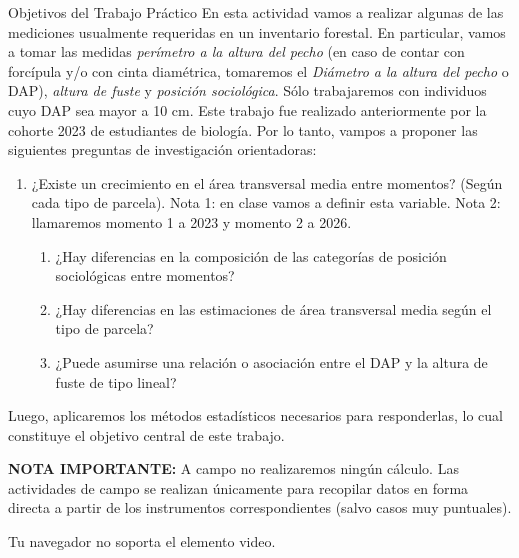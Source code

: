 \documentclass[
  spanish,
  letterpaper,
  DIV=11,
  numbers=noendperiod]{scrreprt}
\begin{document}
Objetivos del Trabajo Práctico En esta actividad vamos a realizar
algunas de las mediciones usualmente requeridas en un inventario
forestal. En particular, vamos a tomar las medidas \emph{perímetro a la
altura del pecho} (en caso de contar con forcípula y/o con cinta
diamétrica, tomaremos el \emph{Diámetro a la altura del pecho} o DAP),
\emph{altura de fuste} y \emph{posición sociológica}. Sólo trabajaremos
con individuos cuyo DAP sea mayor a 10 cm. Este trabajo fue realizado
anteriormente por la cohorte 2023 de estudiantes de biología. Por lo
tanto, vampos a proponer las siguientes preguntas de investigación
orientadoras:

\begin{enumerate}
\def\labelenumi{\arabic{enumi}.}
\item
  ¿Existe un crecimiento en el área transversal media entre momentos?
  (Según cada tipo de parcela). Nota 1: en clase vamos a definir esta
  variable. Nota 2: llamaremos momento 1 a 2023 y momento 2 a 2026.

  \begin{enumerate}
  \def\labelenumii{\arabic{enumii}.}
  \setcounter{enumii}{1}
  \item
    ¿Hay diferencias en la composición de las categorías de posición
    sociológicas entre momentos?
  \item
    ¿Hay diferencias en las estimaciones de área transversal media según
    el tipo de parcela?
  \item
    ¿Puede asumirse una relación o asociación entre el DAP y la altura
    de fuste de tipo lineal?
  \end{enumerate}
\end{enumerate}

Luego, aplicaremos los métodos estadísticos necesarios para
responderlas, lo cual constituye el objetivo central de este trabajo.

\textbf{NOTA IMPORTANTE: } A campo no realizaremos ningún cálculo. Las
actividades de campo se realizan únicamente para recopilar datos en
forma directa a partir de los instrumentos correspondientes (salvo casos
muy puntuales).

Tu navegador no soporta el elemento video.

\begin{tcolorbox}[enhanced jigsaw, arc=.35mm, bottomrule=.15mm, bottomtitle=1mm, breakable, colback=white, colbacktitle=quarto-callout-note-color!10!white, colframe=quarto-callout-note-color-frame, coltitle=black, left=2mm, leftrule=.75mm, opacityback=0, opacitybacktitle=0.6, rightrule=.15mm, title=\textcolor{quarto-callout-note-color}{\faInfo}\hspace{0.5em}{Lectura obligatoria antes de la salida a campo.}, titlerule=0mm, toprule=.15mm, toptitle=1mm]

\end{tcolorbox}
\end{document}
